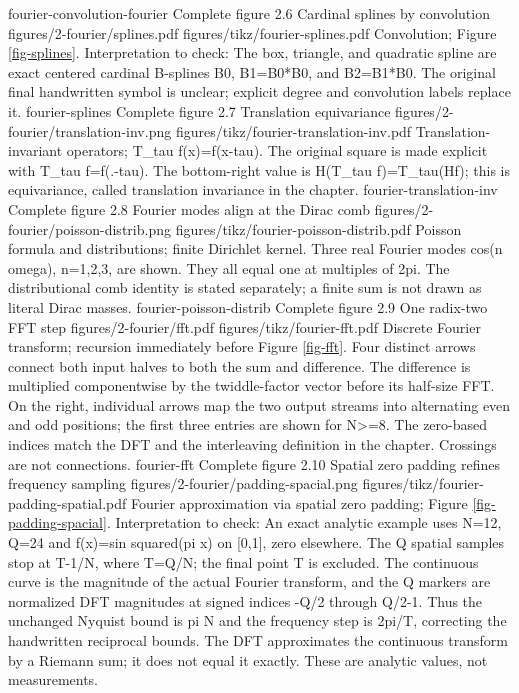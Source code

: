 {fourier-convolution-fourier}
{Complete figure}
{2.6}
{Cardinal splines by convolution}
{figures/2-fourier/splines.pdf}
{figures/tikz/fourier-splines.pdf}
{Convolution; Figure \ref{fig-splines}.}
{Interpretation to check: The box, triangle, and quadratic spline are exact centered cardinal B-splines B0, B1=B0*B0, and B2=B1*B0. The original final handwritten symbol is unclear; explicit degree and convolution labels replace it.}
{fourier-splines}
{Complete figure}
{2.7}
{Translation equivariance}
{figures/2-fourier/translation-inv.png}
{figures/tikz/fourier-translation-inv.pdf}
{Translation-invariant operators; T\_tau f(x)=f(x-tau).}
{The original square is made explicit with T\_tau f=f(.-tau). The bottom-right value is H(T\_tau f)=T\_tau(Hf); this is equivariance, called translation invariance in the chapter.}
{fourier-translation-inv}
{Complete figure}
{2.8}
{Fourier modes align at the Dirac comb}
{figures/2-fourier/poisson-distrib.png}
{figures/tikz/fourier-poisson-distrib.pdf}
{Poisson formula and distributions; finite Dirichlet kernel.}
{Three real Fourier modes cos(n omega), n=1,2,3, are shown. They all equal one at multiples of 2pi. The distributional comb identity is stated separately; a finite sum is not drawn as literal Dirac masses.}
{fourier-poisson-distrib}
{Complete figure}
{2.9}
{One radix-two FFT step}
{figures/2-fourier/fft.pdf}
{figures/tikz/fourier-fft.pdf}
{Discrete Fourier transform; recursion immediately before Figure \ref{fig-fft}.}
{Four distinct arrows connect both input halves to both the sum and difference. The difference is multiplied componentwise by the twiddle-factor vector before its half-size FFT. On the right, individual arrows map the two output streams into alternating even and odd positions; the first three entries are shown for N>=8. The zero-based indices match the DFT and the interleaving definition in the chapter. Crossings are not connections.}
{fourier-fft}
{Complete figure}
{2.10}
{Spatial zero padding refines frequency sampling}
{figures/2-fourier/padding-spacial.png}
{figures/tikz/fourier-padding-spatial.pdf}
{Fourier approximation via spatial zero padding; Figure \ref{fig-padding-spacial}.}
{Interpretation to check: An exact analytic example uses N=12, Q=24 and f(x)=sin squared(pi x) on [0,1], zero elsewhere. The Q spatial samples stop at T-1/N, where T=Q/N; the final point T is excluded. The continuous curve is the magnitude of the actual Fourier transform, and the Q markers are normalized DFT magnitudes at signed indices -Q/2 through Q/2-1. Thus the unchanged Nyquist bound is pi N and the frequency step is 2pi/T, correcting the handwritten reciprocal bounds. The DFT approximates the continuous transform by a Riemann sum; it does not equal it exactly. These are analytic values, not measurements.}
